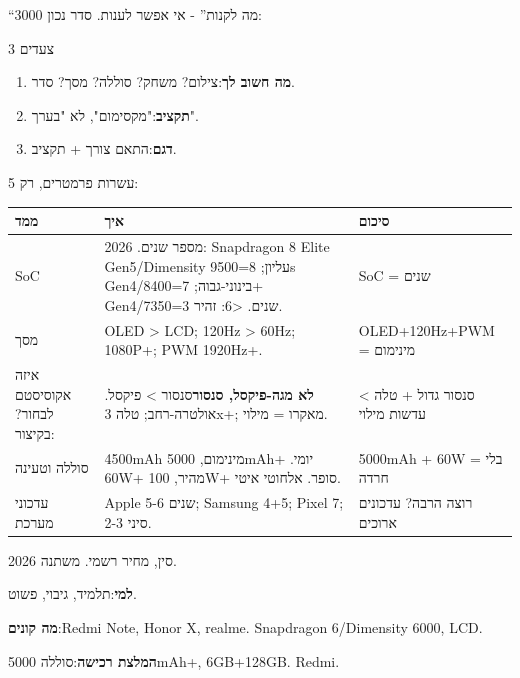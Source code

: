


“3000 מה לקנות” - אי אפשר לענות. סדר נכון:

\begin{tcbinfo}{3 צעדים}
\begin{enumerate}
  \item \textbf{מה חשוב לך}:צילום? משחק? סוללה? מסך? סדר.
  \item \textbf{תקציב}:"מקסימום", לא "בערך".
  \item \textbf{דגם}:התאם צורך + תקציב.
\end{enumerate}

\end{tcbinfo}


עשרות פרמטרים, רק 5:

\begin{center}
\begin{tabularx}{\linewidth}{|X|X|X|}
\hline
\textbf{ממד} & \textbf{איך} & \textbf{סיכום} \tabularnewline
\hline
SoC & מספר שנים. 2026: Snapdragon 8 Elite Gen5/Dimensity 9500=עליון; 8s Gen4/8400=בינוני-גבוה; 7+ Gen4/7350=3 שנים. <6: זהיר. & SoC = שנים \tabularnewline
מסך & OLED > LCD; 120Hz > 60Hz; 1080P+; PWM 1920Hz+. & OLED+120Hz+PWM = מינימום \tabularnewline
איזה אקוסיסטם לבחור? בקיצור: & \textbf{לא מגה-פיקסל, סנסור}סנסור > פיקסל. אולטרה-רחב; טלה 3x+; מאקרו = מילוי. & סנסור גדול + טלה > עדשות מילוי \tabularnewline
סוללה וטעינה & 4500mAh מינימום, 5000mAh+ יומי. 60W+ מהיר, 100W+ סופר. אלחוטי איטי. & 5000mAh + 60W = בלי חרדה \tabularnewline
עדכוני מערכת & Apple 5-6 שנים; Samsung 4+5; Pixel 7; סיני 2-3. & רוצה הרבה? עדכונים ארוכים \tabularnewline
\hline
\end{tabularx}
\end{center}


2026 סין, מחיר רשמי. משתנה.


\textbf{למי}:תלמיד, גיבוי, פשוט.

\textbf{מה קונים}:Redmi Note, Honor X, realme. Snapdragon 6/Dimensity 6000, LCD.

\textbf{המלצת רכישה}:סוללה 5000mAh+, 6GB+128GB. Redmi.


